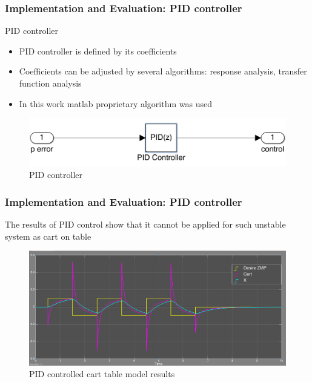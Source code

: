 \documentclass{beamer}
\begin{document}

	\begin{frame}
		\frametitle{Implementation and Evaluation: PID controller}
		\begin{block}{PID controller}
			\begin{itemize}
				\item
					PID controller is defined by its coefficients
				\item
					Coefficients can be adjusted by several algorithms: response analysis, transfer function analysis
				\item 
					In this work matlab proprietary algorithm was used 
			\end{itemize}
		\end{block}
		
		\begin{figure}[h!]
			\centering
			\includegraphics[width=\linewidth]{presentation_images/20}
			\caption{PID controller}
		\end{figure}
	\end{frame}
	

	\begin{frame}
		\frametitle{Implementation and Evaluation: PID controller}
		The results of PID control show that it cannot be applied for such unstable system as cart on table
		
		\begin{figure}[h!]
			\centering
			\includegraphics[width=\linewidth]{presentation_images/21}
			\caption{PID controlled cart table model results}
		\end{figure}
	\end{frame}
	
\end{document}

